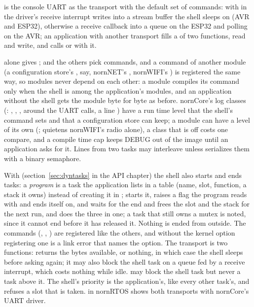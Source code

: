  is the console UART as the transport with the default set of
commands: with  in  the driver's receive
interrupt writes into a stream buffer the shell sleeps on (AVR and ESP32), otherwise a
receive callback into a queue on the ESP32 and polling on the AVR; an application
with another transport fills a  of two functions, read and write, and
calls  or  with it.

 alone gives ;  and the
others pick commands, and a command of another module (a configuration store's
, say, nornNET's , nornWIFI's ) is registered the same
way, so modules never depend on each other: a module compiles its command only when the
shell is among the application's modules, and an application without the shell gets the
module byte for byte as before. nornCore's log classes (: ,
, ,  around the UART calls, a line
) have a run time level that the shell's  command sets
and that a configuration store can keep; a module can have a level of its own
(;  quietens nornWIFI's radio alone), a class
that is off costs one compare, and a compile time cap keeps DEBUG out of the image until
an application asks for it. Lines from two tasks may interleave unless
 serializes them with a binary semaphore.

With  (section~\ref{sec:dyntasks} in the API chapter)
the shell also starts and ends tasks: a \emph{program} is a task the application lists in
a  table (name, slot, function, a stack it owns) instead of
creating it in ;  starts it,  raises a flag
the program reads with  and ends itself on, and
 waits for the end and frees the slot and the stack for the next run,
and  does the three in one; a task that still owns a mutex is noted,
since it cannot end before it has released it.
Nothing is ended from outside. The commands (,
, ) are registered like the others, and
without the kernel option registering one is a link error that names the option.
The transport is two functions:  returns the bytes available, or nothing, in
which case the shell sleeps  before asking again; it may also
block the shell task on a queue fed by a receive interrupt, which costs nothing while
idle.  may block the shell task but never a task above it. The shell's
priority is the application's, like every other task's, and  refuses
a slot that is taken.  in nornRTOS shows both transports with
nornCore's UART driver.

